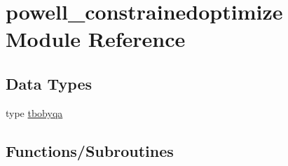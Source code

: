 \hypertarget{namespacepowell__constrainedoptimize}{}\section{powell\+\_\+constrainedoptimize Module Reference}
\label{namespacepowell__constrainedoptimize}
\subsection*{Data Types}
\begin{DoxyCompactItemize}
\item 
type \mbox{\hyperlink{structpowell__constrainedoptimize_1_1tbobyqa}{tbobyqa}}
\end{DoxyCompactItemize}
\subsection*{Functions/\+Subroutines}
